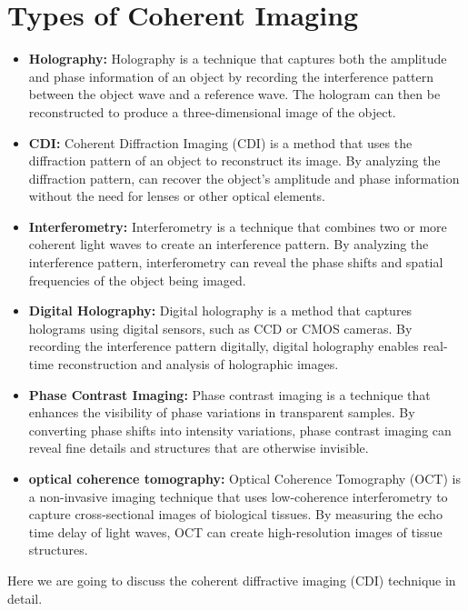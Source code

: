 \documentclass[12pt, a4paper, twocolumn]{article}
\begin{document}
\section{Types of Coherent Imaging}
	\begin{itemize}
		\item \textbf{Holography:} Holography is a technique that captures both the amplitude and phase information of an object by recording the interference pattern between the object wave and a reference wave. The hologram can then be reconstructed to produce a three-dimensional image of the object.
		\item \textbf{CDI:} Coherent Diffraction Imaging (CDI) is a method that uses the diffraction pattern of an object to reconstruct its image. By analyzing the diffraction pattern, can recover the object's amplitude and phase information without the need for lenses or other optical elements.
		\item \textbf{Interferometry:} Interferometry is a technique that combines two or more coherent light waves to create an interference pattern. By analyzing the interference pattern, interferometry can reveal the phase shifts and spatial frequencies of the object being imaged.
		\item \textbf{Digital Holography:} Digital holography is a method that captures holograms using digital sensors, such as CCD or CMOS cameras. By recording the interference pattern digitally, digital holography enables real-time reconstruction and analysis of holographic images.
		\item \textbf{Phase Contrast Imaging:} Phase contrast imaging is a technique that enhances the visibility of phase variations in transparent samples. By converting phase shifts into intensity variations, phase contrast imaging can reveal fine details and structures that are otherwise invisible.
		\item \textbf{optical coherence tomography:} Optical Coherence Tomography (OCT) is a non-invasive imaging technique that uses low-coherence interferometry to capture cross-sectional images of biological tissues. By measuring the echo time delay of light waves, OCT can create high-resolution images of tissue structures.
	\end{itemize}
	
	Here we are going to discuss the coherent diffractive imaging (CDI) technique in detail.
\end{document}
